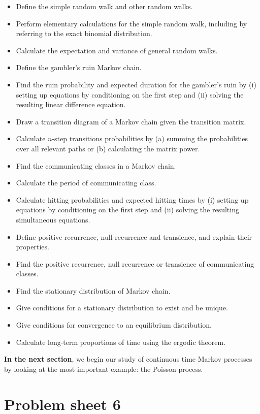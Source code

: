 \documentclass[
  a4paper,
]{article}
\providecommand{\tightlist}{%
  \setlength{\itemsep}{0pt}\setlength{\parskip}{0pt}}
\theoremstyle{definition}
\theoremstyle{definition}
\theoremstyle{definition}
\theoremstyle{remark}
\begin{document}
\begin{itemize}
\tightlist
\item
  Define the simple random walk and other random walks.
\item
  Perform elementary calculations for the simple random walk, including by referring to the exact binomial distribution.
\item
  Calculate the expectation and variance of general random walks.
\item
  Define the gambler's ruin Markov chain.
\item
  Find the ruin probability and expected duration for the gambler's ruin by (i) setting up equations by conditioning on the first step and (ii) solving the resulting linear difference equation.
\item
  Draw a transition diagram of a Markov chain given the transition matrix.
\item
  Calculate \(n\)-step transitions probabilities by (a) summing the probabilities over all relevant paths or (b) calculating the matrix power.
\item
  Find the communicating classes in a Markov chain.
\item
  Calculate the period of communicating class.
\item
  Calculate hitting probabilities and expected hitting times by (i) setting up equations by conditioning on the first step and (ii) solving the resulting simultaneous equations.
\item
  Define positive recurrence, null recurrence and transience, and explain their properties.
\item
  Find the positive recurrence, null recurrence or transience of communicating classes.
\item
  Find the stationary distribution of Markov chain.
\item
  Give conditions for a stationary distribution to exist and be unique.
\item
  Give conditions for convergence to an equilibrium distribution.
\item
  Calculate long-term proportions of time using the ergodic theorem.
\end{itemize}

\textbf{In the next section}, we begin our study of continuous time Markov processes by looking at the most important example: the Poisson process.

\hypertarget{P06}{%
\section*{Problem sheet 6}\label{P06}}
\end{document}
